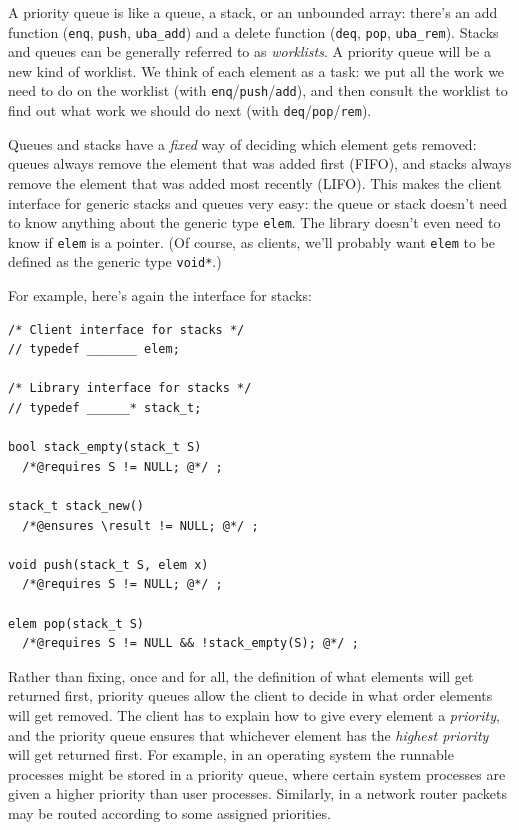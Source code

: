 A priority queue is like a queue, a stack, or an unbounded array: there's an
add function (\lstinline'enq', \lstinline'push', \lstinline'uba_add') and a
delete function (\lstinline'deq', \lstinline'pop', \lstinline'uba_rem').
Stacks and queues can be generally referred to as \emph{worklists}. A priority
queue will be a new kind of worklist.  We think of each element as a task: we
put all the work we need to do on the worklist (with
\lstinline'enq'/\lstinline'push'/\lstinline'add'), and then consult the
worklist to find out what work we should do next (with
\lstinline'deq'/\lstinline'pop'/\lstinline'rem').

Queues and stacks have a \emph{fixed} way of deciding which element
gets removed: queues always remove the element that was added first
(FIFO), and stacks always remove the element that was added most
recently (LIFO). This makes the client interface for generic stacks
and queues very easy: the queue or stack doesn't need to know anything
about the generic type \lstinline'elem'. The library doesn't even need to
know if \lstinline'elem' is a pointer. (Of course, as clients, we'll
probably want \lstinline'elem' to be defined as the generic type
\lstinline'void*'.)

For example, here's again the interface for stacks:
\begin{lstlisting}[language={[C0]C}]
/* Client interface for stacks */
// typedef _______ elem;

/* Library interface for stacks */
// typedef ______* stack_t;

bool stack_empty(stack_t S)
  /*@requires S != NULL; @*/ ;

stack_t stack_new()
  /*@ensures \result != NULL; @*/ ;

void push(stack_t S, elem x)
  /*@requires S != NULL; @*/ ;

elem pop(stack_t S)
  /*@requires S != NULL && !stack_empty(S); @*/ ;
\end{lstlisting}
Rather than fixing, once and for all, the definition of what elements will get
returned first, priority queues allow the client to decide in what order
elements will get removed. The client has to explain how to give every element
a \emph{priority}, and the priority queue ensures that whichever element has
the \emph{highest priority} will get returned first. For example, in an
operating system the runnable processes might be stored in a priority queue,
where certain system processes are given a higher priority than user
processes.  Similarly, in a network router packets may be routed according to
some assigned priorities.

